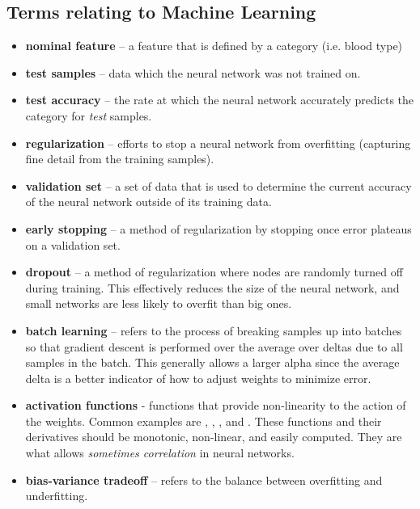 \documentclass[]{article}
\begin{document}
\subsection*{Terms relating to Machine Learning}
\begin{itemize}
	\item \textbf{nominal feature} -- a feature that is defined by a category (i.e. blood type)
	\item \textbf{test samples} -- data which the neural network was not trained on.
	\item \textbf{test accuracy} -- the rate at which the neural network accurately predicts the category for \emph{test} samples.
	\item \textbf{regularization} -- efforts to stop a neural network from overfitting (capturing fine detail from the training samples).
	\item \textbf{validation set} -- a set of data that is used to determine the current accuracy of the neural network outside of its training data.
	\item \textbf{early stopping} -- a method of regularization by stopping once error plateaus on a validation set.
	\item \textbf{dropout} -- a method of regularization where nodes are randomly turned off during training.  This effectively reduces the size of the neural network, and small networks are less likely to overfit than big ones. 
	\item \textbf{batch learning} -- refers to the process of breaking samples up into batches so that gradient descent is performed over the average over deltas due to all samples in the batch.  This generally allows a larger alpha since the average delta is a better indicator of how to adjust weights to minimize error.
	\item \textbf{activation functions} - functions that provide non-linearity to the action of the weights.  Common examples are , , , and .  These functions and their derivatives should be monotonic, non-linear, and easily computed.  They are what allows \emph{sometimes correlation} in neural networks.
	\item \textbf{bias-variance tradeoff} -- refers to the balance between overfitting and underfitting.
\end{itemize}
\end{document}
